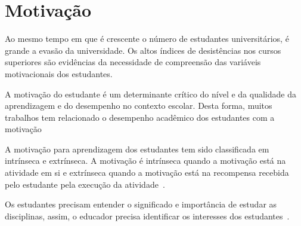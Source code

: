 \section{Motivação}
\label{sec-revisao-motivacao}
Ao mesmo tempo em que é crescente o número
de estudantes universitários, é grande a
evasão da universidade.
Os altos índices de desistências nos cursos
superiores são evidências da necessidade de
compreensão das variáveis motivacionais
dos estudantes.

A motivação do estudante é um determinante crítico 
do  nível  e  da  qualidade  da  aprendizagem
e do desempenho no contexto
escolar.
Desta forma, muitos trabalhos tem relacionado o desempenho
acadêmico dos estudantes com
a motivação~\cite{zenorini2011motivaccao,rufini2011estudo}

A motivação para aprendizagem dos estudantes
tem sido classificada em intrínseca e
extrínseca.
A motivação é intrínseca quando a motivação
está na atividade em si e extrínseca quando
a motivação está na recompensa recebida pelo estudante
pela execução da
atividade~\cite{rufini2011estudo,neves2007escala}.

Os estudantes precisam entender o significado e importância
de estudar as disciplinas, assim, o educador
precisa identificar os interesses
dos estudantes~\cite{angeli2011relaccao}.
